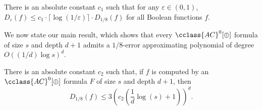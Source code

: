 \documentclass{toc}
\newcommand{\eps}{\varepsilon}
\newcommand{\AC}{\cclass{AC}}
\begin{document}
\begin{lemma}\label{la:eps}
There is an absolute constant $c_1$ such that for any $\varepsilon \in (0,1)$, $D_\eps(f) \le c_1\cdot\lceil \log(1/\eps)\rceil \cdot D_{1/8}(f)$ for all Boolean functions $f$.
\end{lemma}

We now state our main result, which shows that every $\AC^0[\oplus]$ formula of size $s$ and depth $d + 1$ admits a $1/8$-error approximating polynomial of degree $O((1/d)\log s)^d$.

\begin{theorem}
  There is an absolute constant $c_2$ such that, if $f$ is computed by an $\AC^0[\oplus]$ formula $F$ of size $s$ and depth $d+1$, then
  \[
    D_{1/8}(f) \le 3\left(c_2\left(\frac{1}{d}\log(s)+1\right)\right)^d.
  \]
\end{theorem}
\end{document}
